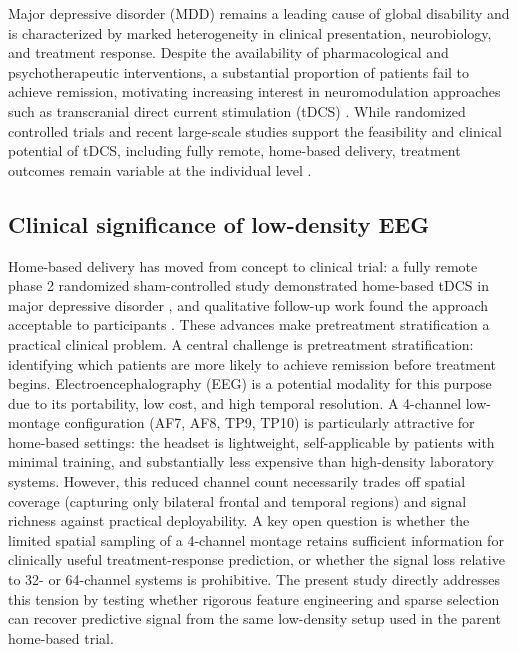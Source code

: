 Major depressive disorder (MDD) remains a leading cause of global disability and is characterized by marked heterogeneity in clinical presentation, neurobiology, and treatment response. Despite the availability of pharmacological and psychotherapeutic interventions, a substantial proportion of patients fail to achieve remission, motivating increasing interest in neuromodulation approaches such as transcranial direct current stimulation (tDCS) \citep{Woodham2021}. While randomized controlled trials and recent large-scale studies support the feasibility and clinical potential of tDCS, including fully remote, home-based delivery, treatment outcomes remain variable at the individual level \citep{woodham2025home,Hampsey2026}.

\subsection{Clinical significance of low-density EEG}

Home-based delivery has moved from concept to clinical trial: a fully remote phase 2 randomized sham-controlled study demonstrated home-based tDCS in major depressive disorder \citep{woodham2025home}, and qualitative follow-up work found the approach acceptable to participants \citep{Rimmer2024}. These advances make pretreatment stratification a practical clinical problem. A central challenge is pretreatment stratification: identifying which patients are more likely to achieve remission before treatment begins. Electroencephalography (EEG) is a potential modality for this purpose due to its portability, low cost, and high temporal resolution. A 4-channel low-montage configuration (AF7, AF8, TP9, TP10) is particularly attractive for home-based settings: the headset is lightweight, self-applicable by patients with minimal training, and substantially less expensive than high-density laboratory systems. However, this reduced channel count necessarily trades off spatial coverage (capturing only bilateral frontal and temporal regions) and signal richness against practical deployability. A key open question is whether the limited spatial sampling of a 4-channel montage retains sufficient information for clinically useful treatment-response prediction, or whether the signal loss relative to 32- or 64-channel systems is prohibitive. The present study directly addresses this tension by testing whether rigorous feature engineering and sparse selection can recover predictive signal from the same low-density setup used in the parent home-based trial.

